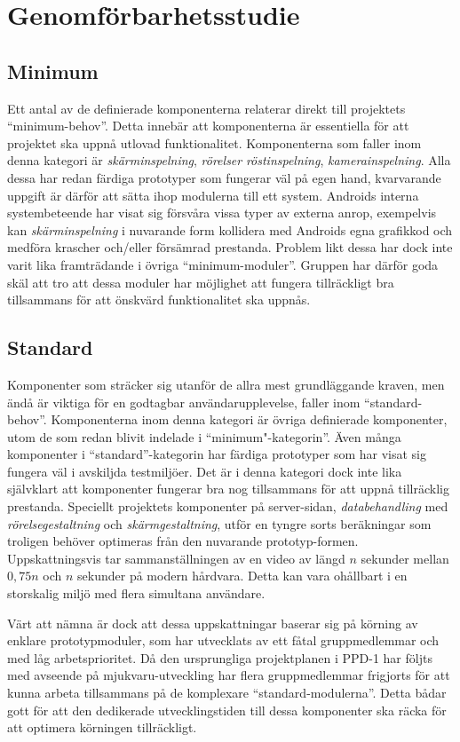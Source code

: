 \section{Genomförbarhetsstudie}

\subsection{Minimum} %
\label{sub:Minimum}

Ett antal av de definierade komponenterna relaterar direkt till projektets ``minimum-behov''. Detta innebär att komponenterna är essentiella för att projektet ska uppnå utlovad funktionalitet. Komponenterna som faller inom denna kategori är \textit{skärminspelning}, \textit{rörelser} \textit{röstinspelning}, \textit{kamerainspelning}. Alla dessa har redan färdiga prototyper som fungerar väl på egen hand, kvarvarande uppgift är därför att sätta ihop modulerna till ett system. Androids interna systembeteende har visat sig försvåra vissa typer av externa anrop, exempelvis kan \textit{skärminspelning} i nuvarande form kollidera med Androids egna grafikkod och medföra krascher och/eller försämrad prestanda. Problem likt dessa har dock inte varit lika framträdande i övriga ``minimum-moduler''. Gruppen har därför goda skäl att tro att dessa moduler har möjlighet att fungera tillräckligt bra tillsammans för att önskvärd funktionalitet ska uppnås.

\subsection{Standard} %
\label{sub:Standard}

Komponenter som sträcker sig utanför de allra mest grundläggande kraven, men ändå är viktiga för en godtagbar användarupplevelse, faller inom ``standard-behov''. Komponenterna inom denna kategori är övriga definierade komponenter, utom de som redan blivit indelade i ``minimum"-kategorin''. Även många komponenter i ``standard''-kategorin har färdiga prototyper som har visat sig fungera väl i avskiljda testmiljöer. Det är i denna kategori dock inte lika självklart att komponenter fungerar bra nog tillsammans för att uppnå tillräcklig prestanda. Speciellt projektets komponenter på server-sidan, \textit{databehandling} med \textit{rörelsegestaltning} och \textit{skärmgestaltning}, utför en tyngre sorts beräkningar som troligen behöver optimeras från den nuvarande prototyp-formen. Uppskattningsvis tar sammanställningen av en video av längd $n$ sekunder mellan $0,{}75n$ och $n$ sekunder på modern hårdvara. Detta kan vara ohållbart i en storskalig miljö med flera simultana användare.

Värt att nämna är dock att dessa uppskattningar baserar sig på körning av enklare prototypmoduler, som har utvecklats av ett fåtal gruppmedlemmar och med låg arbetsprioritet. Då den ursprungliga projektplanen i PPD-1 har följts med avseende på mjukvaru-utveckling har flera gruppmedlemmar frigjorts för att kunna arbeta tillsammans på de komplexare ``standard-modulerna''. Detta bådar gott för att den dedikerade utvecklingstiden till dessa komponenter ska räcka för att optimera körningen tillräckligt.
